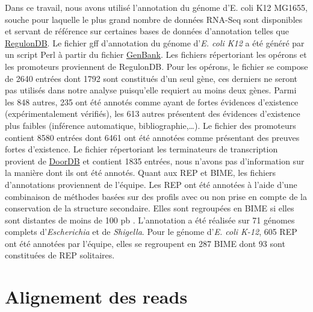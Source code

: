 \documentclass[12pt,a4paper]{report}
\begin{document}
\begin{onehalfspace}
Dans ce travail, nous avons utilisé l'annotation du génome d'E. coli K12 MG1655, souche pour laquelle le plus grand nombre de données RNA-Seq sont disponibles et servant de référence sur certaines bases de données d'annotation telles que \href{http://regulondb.ccg.unam.mx/}{RegulonDB}.
Le fichier \gls{gff} d'annotation du génome d'\textit{E. coli K12} a été généré par un script Perl à partir du fichier \href{http://www.ncbi.nlm.nih.gov/nuccore/NC_000913.2}{GenBank}. Les fichiers répertoriant les opérons et les promoteurs proviennent de RegulonDB. Pour les opérons, le fichier se compose de 2640 entrées dont 1792 sont constitués d'un seul gène, ces derniers ne  seront pas utilisés dans notre analyse puisqu'elle requiert au moins deux gènes. Parmi les 848 autres, 235 ont été annotés comme ayant de fortes évidences d'existence (expérimentalement vérifiés), les 613 autres présentent des évidences d'existence plus faibles (inférence automatique, bibliographie,\ldots). Le fichier des promoteurs contient 8580 entrées dont 6461 ont été annotées comme présentant des preuves fortes d'existence. Le fichier répertoriant les terminateurs de transcription provient de \href{http://csbl.bmb.uga.edu/DOOR/}{DoorDB} et contient 1835 entrées, nous n'avons pas d'information sur la manière dont ils ont été annotés. Quant aux REP et BIME, les fichiers d'annotations proviennent de l'équipe. Les REP ont été annotées à l'aide d'une combinaison de méthodes basées sur des profils avec ou non prise en compte de la conservation de la structure secondaire. Elles sont regroupées en BIME si elles sont distantes de moins de 100 pb \citep{Weyder2013}. L'annotation a été réalisée sur 71 génomes complets d'\textit{Escherichia} et de \textit{Shigella}. Pour le génome d'\textit{E. coli K-12}, 605 REP ont été annotées par l'équipe, elles se regroupent en 287 BIME dont 93 sont constituées de REP solitaires.

\section*{Alignement des reads}


\end{onehalfspace}
\end{document}
